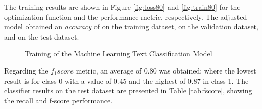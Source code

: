 \documentclass[onecolumn, journal, english, 12pt, a4paper]{IEEEtran} %
\theoremstyle{definition}
\begin{document}
The training results are shown in Figure \ref{fig:loss80} and
\ref{fig:train80} for the optimization function and the performance
metric, respectively. The adjusted model obtained an \emph{accuracy}
of  on the training dataset,  on the
validation dataset, and  on the test dataset.

\begin{figure}[!t]
  \centering
  \hfil
  \caption{Training of the Machine Learning Text Classification Model}
  \label{fig: results}
\end{figure}

Regarding the $f_1score$ metric, an average of 0.80 was obtained;
where the lowest result is for class 0 with a value of 0.45 and the
highest of 0.87 in class 1. The classifier results on the test dataset
are presented in Table \ref{tab:fscore}, showing the recall and
f-score performance.
\end{document}
